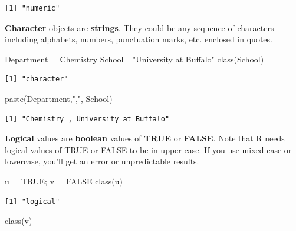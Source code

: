 \documentclass[
  letterpaper,
  DIV=11,
  numbers=noendperiod]{scrreprt}
\newenvironment{Shaded}{\begin{snugshade}}{\end{snugshade}}
\newcommand{\ConstantTok}[1]{\textcolor[rgb]{0.56,0.35,0.01}{#1}}
\newcommand{\FunctionTok}[1]{\textcolor[rgb]{0.28,0.35,0.67}{#1}}
\newcommand{\NormalTok}[1]{\textcolor[rgb]{0.00,0.23,0.31}{#1}}
\newcommand{\OtherTok}[1]{\textcolor[rgb]{0.00,0.23,0.31}{#1}}
\newcommand{\StringTok}[1]{\textcolor[rgb]{0.13,0.47,0.30}{#1}}
\begin{document}
\begin{verbatim}
[1] "numeric"
\end{verbatim}

\textbf{Character} objects are \textbf{strings}. They could be any
sequence of characters including alphabets, numbers, punctuation marks,
etc. enclosed in quotes.

\begin{Shaded}
\begin{Highlighting}[]
\NormalTok{Department }\OtherTok{=} \StringTok{\textquotesingle{}Chemistry\textquotesingle{}}
\NormalTok{School}\OtherTok{=} \StringTok{"University at Buffalo"}
\FunctionTok{class}\NormalTok{(School)}
\end{Highlighting}
\end{Shaded}

\begin{verbatim}
[1] "character"
\end{verbatim}

\begin{Shaded}
\begin{Highlighting}[]
\FunctionTok{paste}\NormalTok{(Department,}\StringTok{","}\NormalTok{, School)}
\end{Highlighting}
\end{Shaded}

\begin{verbatim}
[1] "Chemistry , University at Buffalo"
\end{verbatim}

\textbf{Logical} values are \textbf{boolean} values of \textbf{TRUE} or
\textbf{FALSE}. Note that R needs logical values of TRUE or FALSE to be
in upper case. If you use mixed case or lowercase, you'll get an error
or unpredictable results.

\begin{Shaded}
\begin{Highlighting}[]
\NormalTok{u }\OtherTok{=} \ConstantTok{TRUE}\NormalTok{; }
\NormalTok{v }\OtherTok{=} \ConstantTok{FALSE}
\FunctionTok{class}\NormalTok{(u)}
\end{Highlighting}
\end{Shaded}

\begin{verbatim}
[1] "logical"
\end{verbatim}

\begin{Shaded}
\begin{Highlighting}[]
\FunctionTok{class}\NormalTok{(v)}
\end{Highlighting}
\end{Shaded}
\end{document}
